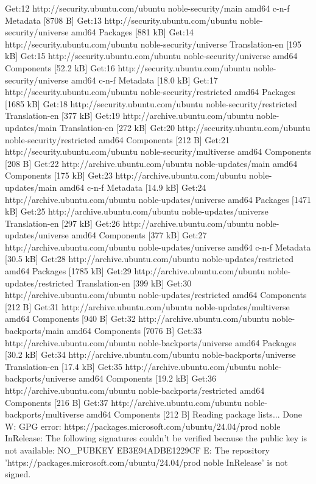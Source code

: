 Get:12 http://security.ubuntu.com/ubuntu noble-security/main amd64 c-n-f Metadata [8708 B]
Get:13 http://security.ubuntu.com/ubuntu noble-security/universe amd64 Packages [881 kB]
Get:14 http://security.ubuntu.com/ubuntu noble-security/universe Translation-en [195 kB]
Get:15 http://security.ubuntu.com/ubuntu noble-security/universe amd64 Components [52.2 kB]
Get:16 http://security.ubuntu.com/ubuntu noble-security/universe amd64 c-n-f Metadata [18.0 kB]
Get:17 http://security.ubuntu.com/ubuntu noble-security/restricted amd64 Packages [1685 kB]
Get:18 http://security.ubuntu.com/ubuntu noble-security/restricted Translation-en [377 kB]
Get:19 http://archive.ubuntu.com/ubuntu noble-updates/main Translation-en [272 kB]
Get:20 http://security.ubuntu.com/ubuntu noble-security/restricted amd64 Components [212 B]
Get:21 http://security.ubuntu.com/ubuntu noble-security/multiverse amd64 Components [208 B]
Get:22 http://archive.ubuntu.com/ubuntu noble-updates/main amd64 Components [175 kB]
Get:23 http://archive.ubuntu.com/ubuntu noble-updates/main amd64 c-n-f Metadata [14.9 kB]
Get:24 http://archive.ubuntu.com/ubuntu noble-updates/universe amd64 Packages [1471 kB]
Get:25 http://archive.ubuntu.com/ubuntu noble-updates/universe Translation-en [297 kB]
Get:26 http://archive.ubuntu.com/ubuntu noble-updates/universe amd64 Components [377 kB]
Get:27 http://archive.ubuntu.com/ubuntu noble-updates/universe amd64 c-n-f Metadata [30.5 kB]
Get:28 http://archive.ubuntu.com/ubuntu noble-updates/restricted amd64 Packages [1785 kB]
Get:29 http://archive.ubuntu.com/ubuntu noble-updates/restricted Translation-en [399 kB]
Get:30 http://archive.ubuntu.com/ubuntu noble-updates/restricted amd64 Components [212 B]
Get:31 http://archive.ubuntu.com/ubuntu noble-updates/multiverse amd64 Components [940 B]
Get:32 http://archive.ubuntu.com/ubuntu noble-backports/main amd64 Components [7076 B]
Get:33 http://archive.ubuntu.com/ubuntu noble-backports/universe amd64 Packages [30.2 kB]
Get:34 http://archive.ubuntu.com/ubuntu noble-backports/universe Translation-en [17.4 kB]
Get:35 http://archive.ubuntu.com/ubuntu noble-backports/universe amd64 Components [19.2 kB]
Get:36 http://archive.ubuntu.com/ubuntu noble-backports/restricted amd64 Components [216 B]
Get:37 http://archive.ubuntu.com/ubuntu noble-backports/multiverse amd64 Components [212 B]
Reading package lists... Done
W: GPG error: https://packages.microsoft.com/ubuntu/24.04/prod noble InRelease: The following signatures couldn't be verified because the public key is not available: NO_PUBKEY EB3E94ADBE1229CF
E: The repository 'https://packages.microsoft.com/ubuntu/24.04/prod noble InRelease' is not signed.
